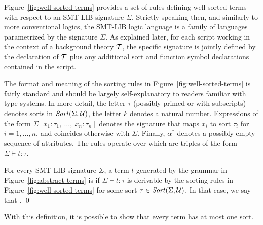 Figure~\ref{fig:well-sorted-terms} provides a set of rules defining 
well-sorted terms with respect to an SMT-LIB signature $\Sigma$.
Strictly speaking then, and similarly to more conventional logics,
the SMT-LIB logic language is a family of languages parametrized 
by the signature $\Sigma$.
As explained later, 
for each script working in the context of a background theory $\mathcal{T}$,
the specific signature is jointly defined by the declaration of $\mathcal{T}$ plus
any additional sort and function symbol declarations contained in the script.

The format and meaning of the sorting rules in Figure~\ref{fig:well-sorted-terms} 
is fairly standard and should be largely self-explanatory 
to readers familiar with type systems.
In more detail, the letter $\tau$ (possibly primed or with subscripts) 
denotes sorts in $\mathit{Sort}(\Sigma, \mathcal{U})$,
the letter $k$ denotes a natural number.
%
Expressions of the form $\Sigma[x_1:\tau_1,\: \ldots,\: x_n:\tau_n]$ 
denotes the signature 
that maps $x_i$ to sort $\tau_i$ for $i=1,\ldots,n$, and 
coincides otherwise with $\Sigma$.
Finally, $\alpha^*$ denotes a possibly empty sequence of attributes.
The rules operate over 
which are triples of the form $\Sigma \vdash t : \tau$.

\begin{definition}
For every SMT-LIB signature $\Sigma$,
a term $t$ generated by the grammar in Figure~\ref{fig:abstract-terms}
is 
if $\Sigma \vdash t : \tau$ is derivable 
by the sorting rules in Figure~\ref{fig:well-sorted-terms}
for some sort $\tau \in \mathit{Sort}(\Sigma,\mathcal{U})$.
In that case, 
we say that .
\qed
\end{definition}

With this definition, it is possible to show that every term has at
most one sort.


